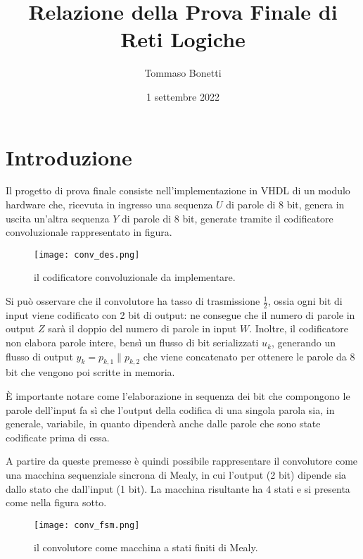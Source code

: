 \documentclass{article}
\title{Relazione della Prova Finale di Reti Logiche}
\author{Tommaso Bonetti}
\date{1 settembre 2022}
\begin{document}
	\begin{titlepage}
		\maketitle
		\thispagestyle{empty}
	\end{titlepage}

	\newpage
	\tableofcontents
	\newpage

	\section{Introduzione}
		Il progetto di prova finale consiste nell'implementazione in VHDL di un modulo
		hardware che, ricevuta in ingresso una sequenza $U$ di parole di 8 bit, genera in
		uscita un'altra sequenza $Y$ di parole di 8 bit, generate tramite il codificatore
		convoluzionale rappresentato in figura.

		\begin{figure}[H]
			\centering
			\texttt{[image: conv\_des.png]}
			\caption{il codificatore convoluzionale da implementare.}
		\end{figure}

		Si può osservare che il convolutore ha tasso di trasmissione $\frac{1}{2}$, ossia
		ogni bit di input viene codificato con 2 bit di output: ne consegue che il numero	di
		parole in output $Z$ sarà il doppio del numero di parole in input $W$.
		Inoltre, il codificatore non elabora parole intere, bensì un flusso di bit
		serializzati $u_k$, generando un flusso di output $y_k = p_{k,1}\|p_{k,2}$ che
		viene concatenato per ottenere le parole da 8 bit che vengono poi scritte in memoria.

		È importante notare come l'elaborazione in sequenza dei bit che compongono le parole
		dell'input fa sì che l'output della codifica di una singola parola sia, in generale,
		variabile, in quanto dipenderà anche dalle parole che sono state codificate prima di
		essa.

		A partire da queste premesse è quindi possibile rappresentare il convolutore come
		una macchina sequenziale sincrona di Mealy, in cui l'output (2 bit) dipende sia dallo
		stato che dall'input (1 bit). La macchina risultante ha 4 stati e si presenta come
		nella figura sotto.

		\begin{figure}[H]
			\centering
			\texttt{[image: conv\_fsm.png]}
			\caption{il convolutore come macchina a stati finiti di Mealy.}
		\end{figure}
\end{document}
